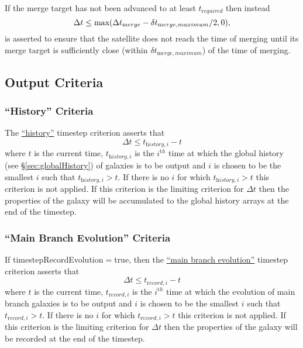 If the merge target has not been advanced to at least $t_{\mathrm required}$ then instead
\begin{equation}
\Delta t \le \hbox{max}(\Delta t_{\mathrm merge}-\delta t_{\mathrm merge,maximum}/2,0),
\end{equation}
is asserted to ensure that the satellite does not reach the time of merging until its merge target is sufficiently close (within $\delta t_{\mathrm merge,maximum}$) of the time of merging.

\subsection{Output Criteria}

\subsubsection{``History'' Criteria}

The \hyperlink{merger_trees.evolve.timesteps.history.F90:merger_tree_timesteps_history:merger_tree_timestep_history}{``history''} timestep criterion asserts that
\begin{equation}
 \Delta t \le t_{{\mathrm history},i} - t
\end{equation}
where $t$ is the current time, $t_{{\mathrm history},i}$ is the $i^{\mathrm th}$ time at which the global history (see \S\ref{sec:globalHistory}) of galaxies is to be output and $i$ is chosen to be the smallest $i$ such that $t_{{\mathrm history},i} > t$. If there is no $i$ for which $t_{{\mathrm history},i} > t$ this criterion is not applied. If this criterion is the limiting criterion for $\Delta t$ then the properties of the galaxy will be accumulated to the global history arrays at the end of the timestep.

\subsubsection{``Main Branch Evolution'' Criteria}

If {\normalfont \ttfamily timestepRecordEvolution}$=${\normalfont \ttfamily true}, then the \hyperlink{merger_trees.evolve.timesteps.record_evolution.F90:merger_tree_timesteps_record_evolution:merger_tree_timestep_record_evolution}{``main branch evolution''} timestep criterion asserts that
\begin{equation}
 \Delta t \le t_{{\mathrm record},i} - t
\end{equation}
where $t$ is the current time, $t_{{\mathrm record},i}$ is the $i^{\mathrm th}$ time at which the evolution of main branch galaxies is to be output and $i$ is chosen to be the smallest $i$ such that $t_{{\mathrm record},i} > t$. If there is no $i$ for which $t_{{\mathrm record},i} > t$ this criterion is not applied. If this criterion is the limiting criterion for $\Delta t$ then the properties of the galaxy will be recorded at the end of the timestep.

